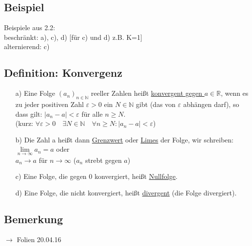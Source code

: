 \documentclass[12pt, titlepage]{article}
\newcommand{\R}{\mathds{R}}
\newcommand{\N}{\mathds{N}}
\newcommand{\infn}{n\rightarrow\infty}
\renewcommand{\>}{\rightarrow}
\renewcommand{\*}{\cdot}
\renewcommand{\epsilon}{\varepsilon}
\begin{document}
	\subsection{Beispiel}
	Beispiele aus 2.2:\\
	beschränkt: a), c), d) [für c) und d) z.B. K=1] \\
	alternierend: c)
	\subsection{Definition: Konvergenz}
	\begin{itemize}
		\item[a)] Eine Folge $(a_n)_{n\in\N}$ reeller Zahlen heißt \underline{konvergent gegen $a\in\R$}, wenn es zu jeder positiven Zahl $\epsilon>0$ ein $N\in\N$ gibt (das von $\epsilon$ abhängen darf), so dass gilt: $|a_n-a|<\epsilon$ für alle $n\geq N$.\\
		(kurz: $\forall\epsilon>0\quad\exists N\in\N\quad\forall n\geq N\colon|a_n-a|<\epsilon$)
		\item[b)] Die Zahl a heißt dann \underline{Grenzwert} oder \underline{Limes} der Folge, wir schreiben:\\
		 $\lim\limits_{\infn}a_n=a$ oder\\
		 $a_n\> a$ für $\infn$ ($a_n$ strebt gegen $a$)
		 \item[c)] Eine Folge, die gegen $0$ konvergiert, heißt \underline{Nullfolge}.
		 \item[d)] Eine Folge, die nicht konvergiert, heißt \underline{divergent} (die Folge divergiert).
	\end{itemize}
	\subsection{Bemerkung}
	$\>$ Folien 20.04.16\\
\end{document}

